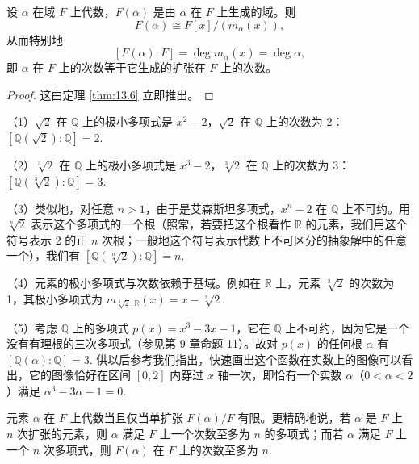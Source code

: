 \begin{proposition}\label{pro:13.11}
设 \(\alpha\) 在域 \(F\) 上代数，\(F(\alpha)\) 是由 \(\alpha\) 在 \(F\) 上生成的域。则
\[
F(\alpha) \cong F[x]/(m_\alpha(x)),
\]
从而特别地
\[
[F(\alpha):F] = \deg m_\alpha(x) = \deg \alpha,
\]
即 \(\alpha\) 在 \(F\) 上的次数等于它生成的扩张在 \(F\) 上的次数。
\end{proposition}

\begin{proof}
这由定理 \ref{thm:13.6} 立即推出。
\end{proof}

\begin{example}
（1）\(\sqrt{2}\) 在 \(\mathbb{Q}\) 上的极小多项式是 \(x^2-2\)，\(\sqrt{2}\) 在 \(\mathbb{Q}\) 上的次数为 2：\([\mathbb{Q}(\sqrt{2}):\mathbb{Q}] = 2\).

（2）\(\sqrt[3]{2}\) 在 \(\mathbb{Q}\) 上的极小多项式是 \(x^3-2\)，\(\sqrt[3]{2}\) 在 \(\mathbb{Q}\) 上的次数为 3：\([\mathbb{Q}(\sqrt[3]{2}):\mathbb{Q}] = 3\).

（3）类似地，对任意 \(n > 1\)，由于是艾森斯坦多项式，\(x^n-2\) 在 \(\mathbb{Q}\) 上不可约。用 \(\sqrt[n]{2}\) 表示这个多项式的一个根（照常，若要把这个根看作 \(\mathbb{R}\) 的元素，我们用这个符号表示 2 的正 \(n\) 次根；一般地这个符号表示代数上不可区分的抽象解中的任意一个），我们有 \([\mathbb{Q}(\sqrt[n]{2}):\mathbb{Q}] = n\).

（4）元素的极小多项式与次数依赖于基域。例如在 \(\mathbb{R}\) 上，元素 \(\sqrt[3]{2}\) 的次数为 1，其极小多项式为 \(m_{\sqrt[3]{2},\mathbb{R}}(x) = x-\sqrt[3]{2}\).

（5）考虑 \(\mathbb{Q}\) 上的多项式 \(p(x) = x^3-3x-1\)，它在 \(\mathbb{Q}\) 上不可约，因为它是一个没有有理根的三次多项式（参见第 9 章命题 11）。故对 \(p(x)\) 的任何根 \(\alpha\) 有 \([\mathbb{Q}(\alpha):\mathbb{Q}] = 3\). 供以后参考我们指出，快速画出这个函数在实数上的图像可以看出，它的图像恰好在区间 \([0,2]\) 内穿过 \(x\) 轴一次，即恰有一个实数 \(\alpha\)（\(0 < \alpha < 2\)）满足 \(\alpha^3-3\alpha-1 = 0\).
\end{example}

\begin{proposition}\label{pro:13.12}
元素 \(\alpha\) 在 \(F\) 上代数当且仅当单扩张 \(F(\alpha)/F\) 有限。更精确地说，若 \(\alpha\) 是 \(F\) 上 \(n\) 次扩张的元素，则 \(\alpha\) 满足 \(F\) 上一个次数至多为 \(n\) 的多项式；而若 \(\alpha\) 满足 \(F\) 上一个 \(n\) 次多项式，则 \(F(\alpha)\) 在 \(F\) 上的次数至多为 \(n\).
\end{proposition}

